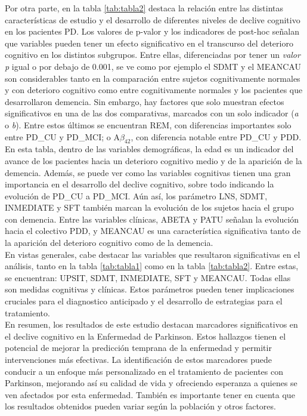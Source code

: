 Por otra parte, en la tabla \ref{tab:tabla2} destaca la relación entre las distintas características de estudio y el desarrollo de diferentes niveles de declive cognitivo en los pacientes PD. Los valores de p-valor y los indicadores de post-hoc señalan que variables pueden tener un efecto significativo en el transcurso del deterioro cognitivo en los distintos subgrupos. Entre ellas, diferenciadas por tener un \textit{valor p} igual o por debajo de 0.001, se ve como por ejemplo el SDMT y el MEANCAU son considerables tanto en la comparación entre sujetos cognitivamente normales y con deterioro cognitivo como entre cognitivamente normales y los pacientes que desarrollaron demencia. Sin embargo, hay factores que solo muestran efectos significativos en una de las dos comparativas, marcados con un solo indicador (\textit{a} o \textit{b}). Entre estos últimos se encuentran REM, con diferencias importantes solo entre PD\_CU y PD\_MCI; o A$\beta_{42}$, con diferencia notable entre PD\_CU y PDD. En esta tabla, dentro de las variables demográficas, la edad es un indicador del avance de los pacientes hacia un deterioro cognitivo medio y de la aparición de la demencia. Además, se puede ver como las variables cognitivas tienen una gran importancia en el desarrollo del declive cognitivo, sobre todo indicando la evolución de PD\_CU a PD\_MCI. Aún así, los parámetro LNS, SDMT, INMEDIATE y SFT también marcan la evolución de los sujetos hacia el grupo con demencia. Entre las variables clínicas, ABETA y PATU señalan la evolución hacia el colectivo PDD, y MEANCAU es una característica significativa tanto de la aparición del deterioro cognitivo como de la demencia. \\

En vistas generales, cabe destacar las variables que resultaron significativas en el análisis, tanto en la tabla \ref{tab:tabla1} como en la tabla \ref{tab:tabla2}. Entre estas, se encuentran: UPSIT, SDMT, INMEDIATE, SFT y MEANCAU. Todas ellas son medidas cognitivas y clínicas. Estos parámetros pueden tener implicaciones cruciales para el diagnostico anticipado y el desarrollo de estrategias para el tratamiento.\\

En resumen, los resultados de este estudio destacan marcadores significativos en el declive cognitivo en la Enfermedad de Parkinson. Estos hallazgos tienen el potencial de mejorar la predicción temprana de la enfermedad y permitir intervenciones más efectivas. La identificación de estos marcadores puede conducir a un enfoque más personalizado en el tratamiento de pacientes con Parkinson, mejorando así su calidad de vida y ofreciendo esperanza a quienes se ven afectados por esta enfermedad. También es importante tener en cuenta que los resultados obtenidos pueden variar según la población y otros factores.



